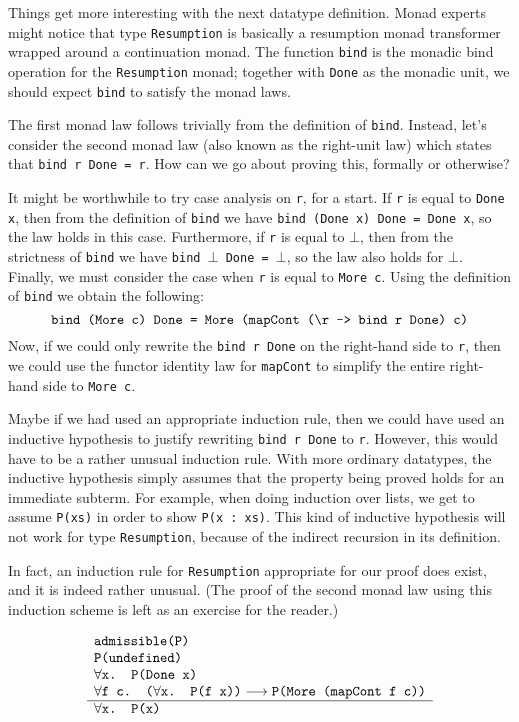 \documentclass{llncs}
\begin{document}
Things get more interesting with the next datatype definition.  Monad
experts might notice that type \texttt{Resumption} is basically a
resumption monad transformer wrapped around a continuation monad.  The
function \texttt{bind} is the monadic bind operation for the
\texttt{Resumption} monad; together with \texttt{Done} as the monadic
unit, we should expect \texttt{bind} to satisfy the monad laws.

The first monad law follows trivially from the definition of
\texttt{bind}.  Instead, let's consider the second monad law (also
known as the right-unit law) which states that \texttt{bind r Done =
  r}.  How can we go about proving this, formally or otherwise?

It might be worthwhile to try case analysis on \texttt{r}, for a
start.  If \texttt{r} is equal to \texttt{Done x}, then from the
definition of \texttt{bind} we have \texttt{bind (Done x) Done = Done
  x}, so the law holds in this case.  Furthermore, if \texttt{r} is
equal to $\bot$, then from the strictness of \texttt{bind} we have
\texttt{bind $\bot$ Done = $\bot$}, so the law also holds for $\bot$.
Finally, we must consider the case when \texttt{r} is equal to
\texttt{More c}.  Using the definition of \texttt{bind} we obtain the
following:
\[
\texttt{bind (More c) Done = More (mapCont (\char '134 r -> bind r Done) c)}
\]
Now, if we could only rewrite the \texttt{bind r Done} on the
right-hand side to \texttt{r}, then we could use the functor identity
law for \texttt{mapCont} to simplify the entire right-hand side to
\texttt{More c}.

Maybe if we had used an appropriate induction rule, then we could have
used an inductive hypothesis to justify rewriting \texttt{bind r Done}
to \texttt{r}.  However, this would have to be a rather unusual
induction rule.  With more ordinary datatypes, the inductive
hypothesis simply assumes that the property being proved holds for an
immediate subterm.  For example, when doing induction over lists, we
get to assume \texttt{P(xs)} in order to show \texttt{P(x : xs)}.
This kind of inductive hypothesis will not work for type
\texttt{Resumption}, because of the indirect recursion in its
definition.

In fact, an induction rule for \texttt{Resumption} appropriate for our
proof does exist, and it is indeed rather unusual.  (The proof of the
second monad law using this induction scheme is left as an exercise
for the reader.)

\begin{equation}
\begin{array}{l}
\mbox{\tt admissible(P)} \\
\mbox{\tt P(undefined)} \\
\mbox{\tt $\forall$x. P(Done x)} \\
\mbox{\tt $\forall$f c. ($\forall$x. P(f x))}
  \longrightarrow \mbox{\tt P(More (mapCont f c))} \\
\hline
\mbox{\tt $\forall$x. P(x)}
\end{array}
\label{eq:induction}
\end{equation}
\end{document}
